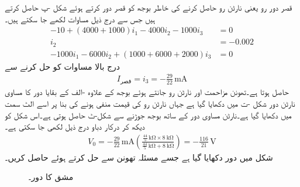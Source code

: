 قصر دور رو یعنی نارٹن رو حاصل کرنے کی خاطر  بوجھ کو قصر دور کرتے ہوئے شکل  -پ  حاصل کرتے ہیں جس سے درج ذیل مساوات لکھے جا سکتے ہیں۔
\begin{align*}
-10+(4000+1000)i_1-4000 i_2 - 1000 i_3&=0\\
i_2&=-0.002\\
-1000 i_1-6000i_2+(1000+6000+2000)i_3&=0
\end{align*} 
درج بالا مساوات کو حل کرنے سے
\begin{align*}
I_{\text{قصر}}=i_3=-\frac{29}{22} \, \si{\milli\ampere}
\end{align*}
حاصل ہوتا ہے۔تھونن مزاحمت اور نارٹن رو جانتے ہوئے    بوجھ کے علاوہ -الف کے بقایا دور کا مساوی نارٹن  دور شکل -ت میں دکھایا گیا ہے جہاں نارٹن رو کی قیمت منفی ہونے کی بنا پر اسے الٹ سمت میں دکھایا گیا ہے۔نارٹن مساوی دور کے ساتھ  بوجھ جوڑنے سے شکل-ٹ حاصل ہوتی ہے۔اس شکل کو دیکھ کر درکار دباو درج ذیل لکھی جا سکتی ہے۔
\begin{align*}
V_0=-\frac{29}{22}\, \si{\milli\ampere} \left(\frac{\frac{44}{5}\, \si{\kilo\ohm}\times \SI{8}{\kilo\ohm}}{\frac{44}{5}\, \si{\kilo\ohm} + \SI{8}{\kilo\ohm}} \right)=-\frac{116}{21} \, \si{\volt}
\end{align*}
شکل  میں دور دکھایا گیا ہے جسے  مسئلہ تھونن سے حل کرتے ہوئے  حاصل کریں۔
\begin{figure}
\centering
{}
\caption{مشق  کا دور۔}
\label{شکل_مسئلہ_مشق_تھونن_الف}
\end{figure}
